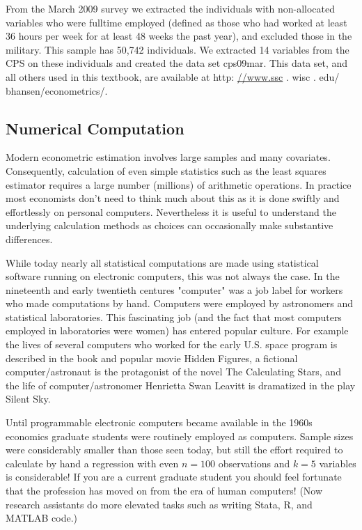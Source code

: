 \documentclass[10pt]{article}
\begin{document}
From the March 2009 survey we extracted the individuals with non-allocated variables who were fulltime employed (defined as those who had worked at least 36 hours per week for at least 48 weeks the past year), and excluded those in the military. This sample has 50,742 individuals. We extracted 14 variables from the CPS on these individuals and created the data set cps09mar. This data set, and all others used in this textbook, are available at http: \href{//www.ssc}{//www.ssc} . wisc . edu/ bhansen/econometrics/.

\subsection{Numerical Computation}
Modern econometric estimation involves large samples and many covariates. Consequently, calculation of even simple statistics such as the least squares estimator requires a large number (millions) of arithmetic operations. In practice most economists don't need to think much about this as it is done swiftly and effortlessly on personal computers. Nevertheless it is useful to understand the underlying calculation methods as choices can occasionally make substantive differences.

While today nearly all statistical computations are made using statistical software running on electronic computers, this was not always the case. In the nineteenth and early twentieth centures "computer" was a job label for workers who made computations by hand. Computers were employed by astronomers and statistical laboratories. This fascinating job (and the fact that most computers employed in laboratories were women) has entered popular culture. For example the lives of several computers who worked for the early U.S. space program is described in the book and popular movie Hidden Figures, a fictional computer/astronaut is the protagonist of the novel The Calculating Stars, and the life of computer/astronomer Henrietta Swan Leavitt is dramatized in the play Silent Sky.

Until programmable electronic computers became available in the 1960s economics graduate students were routinely employed as computers. Sample sizes were considerably smaller than those seen today, but still the effort required to calculate by hand a regression with even $n=100$ observations and $k=5$ variables is considerable! If you are a current graduate student you should feel fortunate that the profession has moved on from the era of human computers! (Now research assistants do more elevated tasks such as writing Stata, R, and MATLAB code.)
\end{document}
